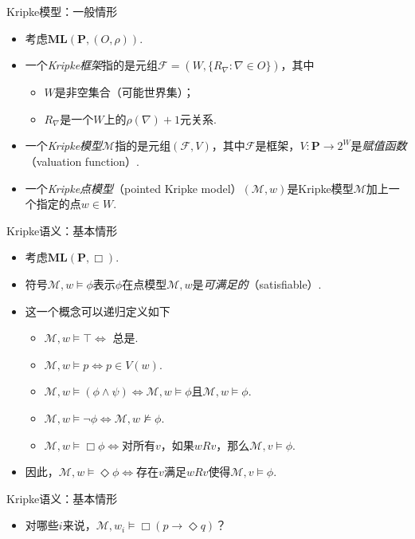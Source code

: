     
    {Kripke模型：一般情形}
    \begin{itemize}
        \item 考虑$\mathbf{ML}(\mathbf{P},(O,\rho))$.
        \item 一个\emph{Kripke框架}指的是元组$\mathcal F=(W,\{R_\nabla:\nabla\in O\})$，其中
        \begin{itemize}
            \item $W$是非空集合（可能世界集）；
            \item $R_\nabla$是一个$W$上的$\rho(\nabla)+1$元关系.
        \end{itemize}
        \item 一个\emph{Kripke模型}$\mathcal{M}$指的是元组$(\mathcal F,V)$，其中$\mathcal F$是框架，$V:\mathbf P\to 2^W$是\emph{赋值函数}（valuation function）.
        \item 一个\emph{Kripke点模型}（pointed Kripke model）$(\mathcal{M},w)$是Kripke模型$\mathcal M$加上一个指定的点$w\in W$.
    \end{itemize}
    
    
    {Kripke语义：基本情形}
    \begin{itemize}
        \item 考虑$\mathbf{ML}(\mathbf{P},\Box)$.
        \item 符号$\mathcal M,w\vDash\phi$表示$\phi$在点模型$\mathcal M,w$是\emph{可满足的}（satisfiable）.
        \item 这一个概念可以递归定义如下
        \begin{itemize}
            \item $\mathcal M, w\vDash\top\iff$ 总是.
            \item $\mathcal M, w\vDash p\iff p\in V(w)$.
            \item $\mathcal M, w\vDash (\phi\wedge\psi)\iff\mathcal M,w\vDash\phi$且$\mathcal M,w\vDash\phi$.
            \item $\mathcal M, w\vDash \neg\phi\iff\mathcal M,w\not\vDash\phi$.
            \item $\mathcal M, w\vDash \Box\phi\iff$对所有$v$，如果$wRv$，那么$\mathcal M,v\vDash\phi$.
        \end{itemize}
        \item 因此，$\mathcal M, w\vDash \Diamond\phi\iff$存在$v$满足$wRv$使得$\mathcal M,v\vDash\phi$.
    \end{itemize}
    
    
    {Kripke语义：基本情形}
    \begin{figure}
        \centering
        
    \end{figure}
    \begin{itemize}
        \item 对哪些$i$来说，$\mathcal M,w_i\vDash\Box (p\to\Diamond q)$？
    \end{itemize}
    
